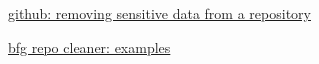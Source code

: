 \documentclass[paper=a4]{scrartcl}
\begin{document}

	\begin{literature} %
  		\item \href{https://docs.github.com/en/authentication/keeping-your-account-and-data-secure/removing-sensitive-data-from-a-repository}{github: removing sensitive data from a repository}
  		\item \href{https://rtyley.github.io/bfg-repo-cleaner/}{bfg repo cleaner: examples}
	\end{literature}





\end{document}
